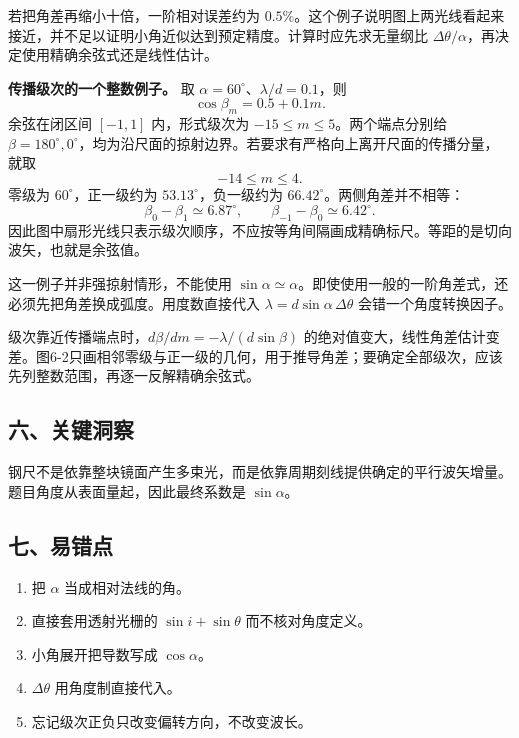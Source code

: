 \documentclass[12pt,a4paper,UTF8]{ctexart}
\newcommand{\tightlist}{\setlength{\itemsep}{0pt}\setlength{\parskip}{0pt}}
\begin{document}
若把角差再缩小十倍，一阶相对误差约为
\(0.5\%\)。这个例子说明图上两光线看起来接近，并不足以证明小角近似达到预定精度。计算时应先求无量纲比
\(\Delta\theta/\alpha\)，再决定使用精确余弦式还是线性估计。

\textbf{传播级次的一个整数例子。} 取
\(\alpha=60^\circ\)、\(\lambda/d=0.1\)，则 \[
\cos\beta_m=0.5+0.1m.
\] 余弦在闭区间 \([-1,1]\) 内，形式级次为
\(-15\le m\le5\)。两个端点分别给
\(\beta=180^\circ,0^\circ\)，均为沿尺面的掠射边界。若要求有严格向上离开尺面的传播分量，就取
\[
-14\le m\le4.
\] 零级为 \(60^\circ\)，正一级约为 \(53.13^\circ\)，负一级约为
\(66.42^\circ\)。两侧角差并不相等： \[
\beta_0-\beta_1\simeq6.87^\circ,
\qquad\beta_{-1}-\beta_0\simeq6.42^\circ.
\]
因此图中扇形光线只表示级次顺序，不应按等角间隔画成精确标尺。等距的是切向波矢，也就是余弦值。

这一例子并非强掠射情形，不能使用
\(\sin\alpha\simeq\alpha\)。即使使用一般的一阶角差式，还必须先把角差换成弧度。用度数直接代入
\(\lambda=d\sin\alpha\,\Delta\theta\) 会错一个角度转换因子。

级次靠近传播端点时，\(d\beta/dm=-\lambda/(d\sin\beta)\)
的绝对值变大，线性角差估计变差。图6-2只画相邻零级与正一级的几何，用于推导角差；要确定全部级次，应该先列整数范围，再逐一反解精确余弦式。

\subsection{六、关键洞察}\label{ux516dux5173ux952eux6d1eux5bdf-5}

钢尺不是依靠整块镜面产生多束光，而是依靠周期刻线提供确定的平行波矢增量。题目角度从表面量起，因此最终系数是
\(\sin\alpha\)。

\subsection{七、易错点}\label{ux4e03ux6613ux9519ux70b9-5}

\begin{enumerate}
\def\labelenumi{\arabic{enumi}.}
\tightlist
\item
  把 \(\alpha\) 当成相对法线的角。
\item
  直接套用透射光栅的 \(\sin i+\sin\theta\) 而不核对角度定义。
\item
  小角展开把导数写成 \(\cos\alpha\)。
\item
  \(\Delta\theta\) 用角度制直接代入。
\item
  忘记级次正负只改变偏转方向，不改变波长。
\end{enumerate}
\end{document}
